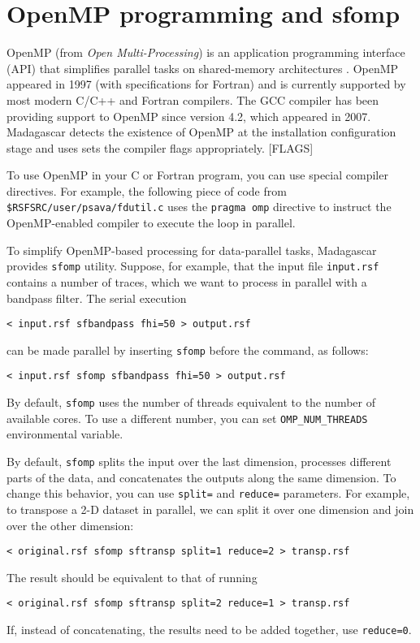 \section{OpenMP programming and sfomp}

OpenMP (from \emph{Open Multi-Processing}) is an application
programming interface (API) that simplifies parallel tasks on
shared-memory architectures \cite[]{chandra,chapman}. OpenMP appeared
in 1997 (with specifications for Fortran) and is currently supported
by most modern C/C++ and Fortran compilers. The GCC compiler has been
providing support to OpenMP since version 4.2, which appeared in
2007. Madagascar detects the existence of OpenMP at the installation
configuration stage and uses sets the compiler flags appropriately. [FLAGS]

To use OpenMP in your C or Fortran program, you can use special
compiler directives. For example, the following piece of code from
\texttt{\$RSFSRC/user/psava/fdutil.c} uses the \texttt{pragma omp}
directive to instruct the OpenMP-enabled compiler to execute the loop
in parallel.

\lstset{language=c,numbers=left,numberstyle=\tiny,showstringspaces=false}


To simplify OpenMP-based processing for data-parallel tasks,
Madagascar provides \texttt{sfomp} utility. Suppose, for example, that
the input file \texttt{input.rsf} contains a number of traces, which
we want to process in parallel with a bandpass filter. The serial execution
\begin{verbatim}
< input.rsf sfbandpass fhi=50 > output.rsf
\end{verbatim}
can be made parallel by inserting \texttt{sfomp} before the command, as follows:
\begin{verbatim}
< input.rsf sfomp sfbandpass fhi=50 > output.rsf
\end{verbatim}

By default, \texttt{sfomp} uses the number of threads equivalent to
the number of available cores. To use a different number, you can set
\texttt{OMP\_NUM\_THREADS} environmental variable.

By default, \texttt{sfomp} splits the input over the last dimension,
processes different parts of the data, and concatenates the outputs
along the same dimension. To change this behavior, you can use
\texttt{split=} and \texttt{reduce=} parameters. For example, to
transpose a 2-D dataset in parallel, we can split it over one
dimension and join over the other dimension:
\begin{verbatim}
< original.rsf sfomp sftransp split=1 reduce=2 > transp.rsf
\end{verbatim}
The result should be equivalent to that of running
\begin{verbatim}
< original.rsf sfomp sftransp split=2 reduce=1 > transp.rsf
\end{verbatim}
If, instead of concatenating, the results need to be added together,
use \texttt{reduce=0}.

